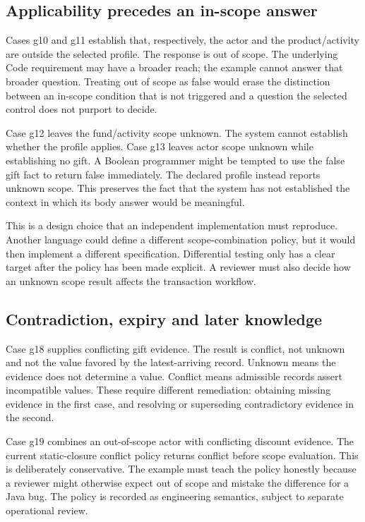 \documentclass[12pt,a4paper,oneside,openany]{book}
\begin{document}
\subsection{Applicability precedes an in-scope answer}
Cases g10 and g11 establish that, respectively, the actor and the product/activity
are outside the selected profile. The response is out of scope. The underlying
Code requirement may have a broader reach; the example cannot answer that
broader question. Treating out of scope as false would erase the distinction
between an in-scope condition that is not triggered and a question the selected
control does not purport to decide.

Case g12 leaves the fund/activity scope unknown. The system cannot establish
whether the profile applies. Case g13 leaves actor scope unknown while
establishing no gift. A Boolean programmer might be tempted to use the false
gift fact to return false immediately. The declared profile instead reports
unknown scope. This preserves the fact that the system has not established the
context in which its body answer would be meaningful.

This is a design choice that an independent implementation must reproduce.
Another language could define a different scope-combination policy, but it
would then implement a different specification. Differential testing only has
a clear target after the policy has been made explicit. A reviewer must also
decide how an unknown scope result affects the transaction workflow.

\subsection{Contradiction, expiry and later knowledge}
Case g18 supplies conflicting gift evidence. The result is conflict, not
unknown and not the value favored by the latest-arriving record. Unknown means
the evidence does not determine a value. Conflict means admissible records
assert incompatible values. These require different remediation: obtaining
missing evidence in the first case, and resolving or superseding contradictory
evidence in the second.

Case g19 combines an out-of-scope actor with conflicting discount evidence.
The current static-closure conflict policy returns conflict before scope
evaluation. This is deliberately conservative. The example must teach the
policy honestly because a reviewer might otherwise expect out of scope and
mistake the difference for a Java bug. The policy is recorded as engineering
semantics, subject to separate operational review.
\end{document}
